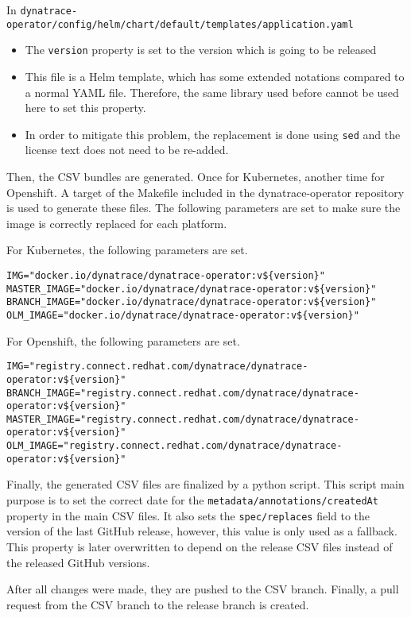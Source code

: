 In \verb|dynatrace-operator/config/helm/chart/default/templates/application.yaml|
\begin{itemize}
    \item The \verb|version| property is set to the version which is going to be released
    \item This file is a Helm template, which has some extended notations compared to a normal YAML file.
        Therefore, the same library used before cannot be used here to set this property.
    \item In order to mitigate this problem, the replacement is done using \verb|sed| and the license text does not need to be re-added.
\end{itemize}

Then, the CSV bundles are generated.
Once for Kubernetes, another time for Openshift.
A target of the Makefile included in the dynatrace-operator repository is used to generate these files.
The following parameters are set to make sure the image is correctly replaced for each platform.

For Kubernetes, the following parameters are set.

\begin{verbatim}
IMG="docker.io/dynatrace/dynatrace-operator:v${version}"
MASTER_IMAGE="docker.io/dynatrace/dynatrace-operator:v${version}"
BRANCH_IMAGE="docker.io/dynatrace/dynatrace-operator:v${version}"
OLM_IMAGE="docker.io/dynatrace/dynatrace-operator:v${version}"
\end{verbatim}

For Openshift, the following parameters are set.

\begin{verbatim}
IMG="registry.connect.redhat.com/dynatrace/dynatrace-operator:v${version}"
BRANCH_IMAGE="registry.connect.redhat.com/dynatrace/dynatrace-operator:v${version}"
MASTER_IMAGE="registry.connect.redhat.com/dynatrace/dynatrace-operator:v${version}"
OLM_IMAGE="registry.connect.redhat.com/dynatrace/dynatrace-operator:v${version}"
\end{verbatim}

Finally, the generated CSV files are finalized by a python script.
This script main purpose is to set the correct date for the \verb|metadata/annotations/createdAt| property in the main CSV files.
It also sets the \verb|spec/replaces| field to the version of the last GitHub release, however, this value is only used as a fallback.
This property is later overwritten to depend on the release CSV files instead of the released GitHub versions.

After all changes were made, they are pushed to the CSV branch.
Finally, a pull request from the CSV branch to the release branch is created.

